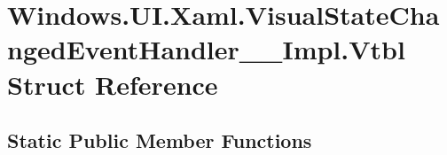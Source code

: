 \hypertarget{struct_windows_1_1_u_i_1_1_xaml_1_1_visual_state_changed_event_handler_____impl_1_1_vtbl}{}\section{Windows.\+U\+I.\+Xaml.\+Visual\+State\+Changed\+Event\+Handler\+\_\+\+\_\+\+Impl.\+Vtbl Struct Reference}
\label{struct_windows_1_1_u_i_1_1_xaml_1_1_visual_state_changed_event_handler_____impl_1_1_vtbl}
\subsection*{Static Public Member Functions}
